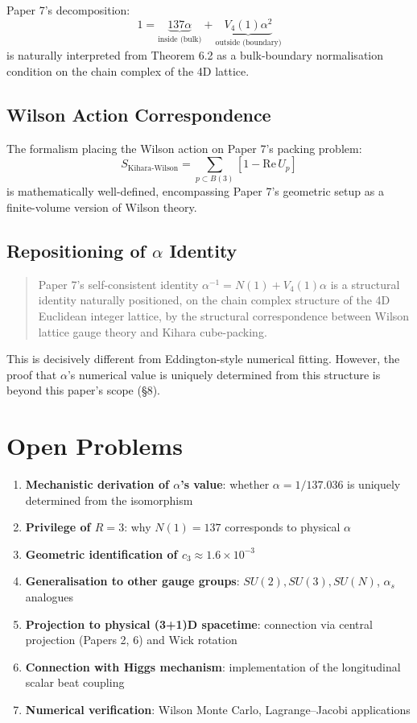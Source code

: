 \documentclass[a4paper,11pt]{article}
\begin{document}
Paper 7's decomposition:
\begin{equation}
1 = \underbrace{137 \alpha}_{\text{inside (bulk)}} + \underbrace{V_4(1) \alpha^2}_{\text{outside (boundary)}} \tag{7.1}
\end{equation}
is naturally interpreted from Theorem 6.2 as a bulk-boundary normalisation condition on the chain complex of the 4D lattice.

\subsection{Wilson Action Correspondence}

The formalism placing the Wilson action on Paper 7's packing problem:
\begin{equation}
S_{\text{Kihara-Wilson}} = \sum_{p \subset B(3)} [1 - \text{Re}\, U_p] \tag{7.2}
\end{equation}
is mathematically well-defined, encompassing Paper 7's geometric setup as a finite-volume version of Wilson theory.

\subsection{Repositioning of $\alpha$ Identity}

\begin{quote}
Paper 7's self-consistent identity $\alpha^{-1} = N(1) + V_4(1)\alpha$ is a structural identity naturally positioned, on the chain complex structure of the 4D Euclidean integer lattice, by the structural correspondence between Wilson lattice gauge theory and Kihara cube-packing.
\end{quote}

This is decisively different from Eddington-style numerical fitting. However, the proof that $\alpha$'s numerical value is uniquely determined from this structure is beyond this paper's scope (§8).

\section{Open Problems}

\begin{enumerate}
\item \textbf{Mechanistic derivation of $\alpha$'s value}: whether $\alpha = 1/137.036$ is uniquely determined from the isomorphism
\item \textbf{Privilege of $R = 3$}: why $N(1) = 137$ corresponds to physical $\alpha$
\item \textbf{Geometric identification of $c_3 \approx 1.6 \times 10^{-3}$}
\item \textbf{Generalisation to other gauge groups}: $SU(2), SU(3), SU(N)$, $\alpha_s$ analogues
\item \textbf{Projection to physical (3+1)D spacetime}: connection via central projection (Papers 2, 6) and Wick rotation
\item \textbf{Connection with Higgs mechanism}: implementation of the longitudinal scalar beat coupling
\item \textbf{Numerical verification}: Wilson Monte Carlo, Lagrange--Jacobi applications
\end{enumerate}
\end{document}
